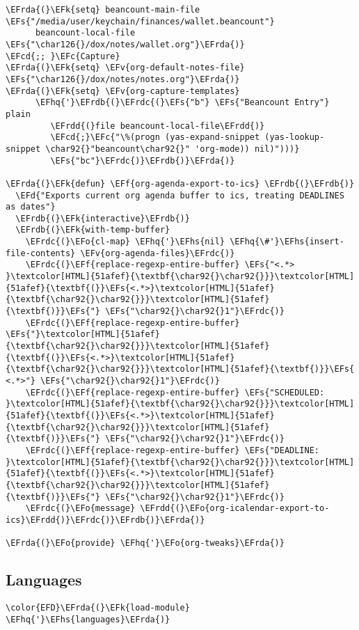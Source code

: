 \documentclass[a4wide,10pt]{article}
\newcommand{\EFc}[1]{\textcolor{EFc}{#1}} %
\newcommand{\EFcd}[1]{\textcolor{EFcd}{#1}} %
\newcommand{\EFs}[1]{\textcolor{EFs}{#1}} %
\newcommand{\EFd}[1]{\textcolor{EFd}{#1}} %
\newcommand{\EFk}[1]{\textcolor{EFk}{#1}} %
\newcommand{\EFf}[1]{\textcolor{EFf}{#1}} %
\newcommand{\EFv}[1]{\textcolor{EFv}{#1}} %
\newcommand{\EFo}[1]{\textcolor{EFo}{#1}} %
\newcommand{\EFhq}[1]{\textcolor{EFhq}{#1}} %
\newcommand{\EFhs}[1]{\textcolor{EFhs}{#1}} %
\newcommand{\EFrda}[1]{\textcolor{EFrda}{#1}} %
\newcommand{\EFrdb}[1]{\textcolor{EFrdb}{#1}} %
\newcommand{\EFrdc}[1]{\textcolor{EFrdc}{#1}} %
\newcommand{\EFrdd}[1]{\textcolor{EFrdd}{#1}} %
\begin{document}
\begin{Code}
\begin{Verbatim}
\EFrda{(}\EFk{setq} beancount-main-file \EFs{"/media/user/keychain/finances/wallet.beancount"}
      beancount-local-file \EFs{"\char126{}/dox/notes/wallet.org"}\EFrda{)}
\EFcd{;; }\EFc{Capture}
\EFrda{(}\EFk{setq} \EFv{org-default-notes-file} \EFs{"\char126{}/dox/notes/notes.org"}\EFrda{)}
\EFrda{(}\EFk{setq} \EFv{org-capture-templates}
      \EFhq{'}\EFrdb{(}\EFrdc{(}\EFs{"b"} \EFs{"Beancount Entry"} plain
         \EFrdd{(}file beancount-local-file\EFrdd{)}
         \EFcd{;}\EFc{"\%(progn (yas-expand-snippet (yas-lookup-snippet \char92{}"beancount\char92{}" 'org-mode)) nil)")))}
         \EFs{"bc"}\EFrdc{)}\EFrdb{)}\EFrda{)}

\EFrda{(}\EFk{defun} \EFf{org-agenda-export-to-ics} \EFrdb{(}\EFrdb{)}
  \EFd{"Exports current org agenda buffer to ics, treating DEADLINES as dates"}
  \EFrdb{(}\EFk{interactive}\EFrdb{)}
  \EFrdb{(}\EFk{with-temp-buffer}
    \EFrdc{(}\EFo{cl-map} \EFhq{'}\EFhs{nil} \EFhq{\#'}\EFhs{insert-file-contents} \EFv{org-agenda-files}\EFrdc{)}
    \EFrdc{(}\EFf{replace-regexp-entire-buffer} \EFs{"<.*> }\textcolor[HTML]{51afef}{\textbf{\char92{}\char92{}}}\textcolor[HTML]{51afef}{\textbf{(}}\EFs{<.*>}\textcolor[HTML]{51afef}{\textbf{\char92{}\char92{}}}\textcolor[HTML]{51afef}{\textbf{)}}\EFs{"} \EFs{"\char92{}\char92{}1"}\EFrdc{)}
    \EFrdc{(}\EFf{replace-regexp-entire-buffer} \EFs{"}\textcolor[HTML]{51afef}{\textbf{\char92{}\char92{}}}\textcolor[HTML]{51afef}{\textbf{(}}\EFs{<.*>}\textcolor[HTML]{51afef}{\textbf{\char92{}\char92{}}}\textcolor[HTML]{51afef}{\textbf{)}}\EFs{ <.*>"} \EFs{"\char92{}\char92{}1"}\EFrdc{)}
    \EFrdc{(}\EFf{replace-regexp-entire-buffer} \EFs{"SCHEDULED: }\textcolor[HTML]{51afef}{\textbf{\char92{}\char92{}}}\textcolor[HTML]{51afef}{\textbf{(}}\EFs{<.*>}\textcolor[HTML]{51afef}{\textbf{\char92{}\char92{}}}\textcolor[HTML]{51afef}{\textbf{)}}\EFs{"} \EFs{"\char92{}\char92{}1"}\EFrdc{)}
    \EFrdc{(}\EFf{replace-regexp-entire-buffer} \EFs{"DEADLINE: }\textcolor[HTML]{51afef}{\textbf{\char92{}\char92{}}}\textcolor[HTML]{51afef}{\textbf{(}}\EFs{<.*>}\textcolor[HTML]{51afef}{\textbf{\char92{}\char92{}}}\textcolor[HTML]{51afef}{\textbf{)}}\EFs{"} \EFs{"\char92{}\char92{}1"}\EFrdc{)}
    \EFrdc{(}\EFo{message} \EFrdd{(}\EFo{org-icalendar-export-to-ics}\EFrdd{)}\EFrdc{)}\EFrdb{)}\EFrda{)}

\EFrda{(}\EFo{provide} \EFhq{'}\EFo{org-tweaks}\EFrda{)}
\end{Verbatim}
\end{Code}

\subsection{Languages}
\label{sec:org165fa8c}
\begin{Code}
\begin{Verbatim}
\color{EFD}\EFrda{(}\EFk{load-module} \EFhq{'}\EFhs{languages}\EFrda{)}
\end{Verbatim}
\end{Code}
\end{document}
